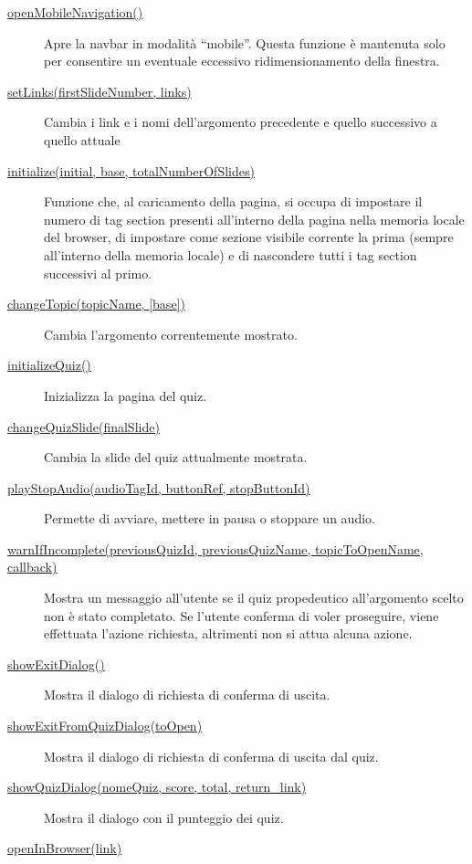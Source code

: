 \begin{description}
\item[{ \protect\hyperlink{openMobileNavigation}{openMobileNavigation()}
}]
Apre la navbar in modalità ``mobile''. Questa funzione è mantenuta solo
per consentire un eventuale eccessivo ridimensionamento della finestra.
\item[{ \protect\hyperlink{setLinks}{setLinks(firstSlideNumber, links)}
}]
Cambia i link e i nomi dell'argomento precedente e quello successivo a
quello attuale
\item[{ \protect\hyperlink{initialize}{initialize(initial, base,
totalNumberOfSlides)} }]
Funzione che, al caricamento della pagina, si occupa di impostare il
numero di tag section presenti all'interno della pagina nella memoria
locale del browser, di impostare come sezione visibile corrente la prima
(sempre all'interno della memoria locale) e di nascondere tutti i tag
section successivi al primo.
\item[{ \protect\hyperlink{changeTopic}{changeTopic(topicName,
{[}base{]})} }]
Cambia l'argomento correntemente mostrato.
\item[{ \protect\hyperlink{initializeQuiz}{initializeQuiz()} }]
Inizializza la pagina del quiz.
\item[{ \protect\hyperlink{changeQuizSlide}{changeQuizSlide(finalSlide)}
}]
Cambia la slide del quiz attualmente mostrata.
\item[{ \protect\hyperlink{playStopAudio}{playStopAudio(audioTagId,
buttonRef, stopButtonId)} }]
Permette di avviare, mettere in pausa o stoppare un audio.
\item[{
\protect\hyperlink{warnIfIncomplete}{warnIfIncomplete(previousQuizId,
previousQuizName, topicToOpenName, callback)} }]
Mostra un messaggio all'utente se il quiz propedeutico all'argomento
scelto non è stato completato. Se l'utente conferma di voler proseguire,
viene effettuata l'azione richiesta, altrimenti non si attua alcuna
azione.
\item[{ \protect\hyperlink{showExitDialog}{showExitDialog()} }]
Mostra il dialogo di richiesta di conferma di uscita.
\item[{
\protect\hyperlink{showExitFromQuizDialog}{showExitFromQuizDialog(toOpen)}
}]
Mostra il dialogo di richiesta di conferma di uscita dal quiz.
\item[{ \protect\hyperlink{showQuizDialog}{showQuizDialog(nomeQuiz,
score, total, return\_link)} }]
Mostra il dialogo con il punteggio dei quiz.
\item[{ \protect\hyperlink{openInBrowser}{openInBrowser(link)} }]

\end{description}
